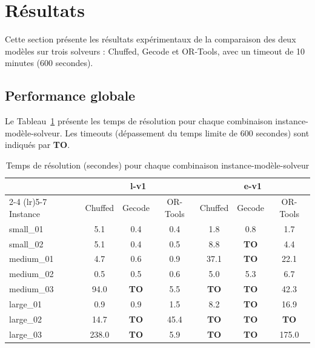 \section{Résultats}
\label{sec:resultats}

Cette section présente les résultats expérimentaux de la comparaison des deux modèles sur trois solveurs : Chuffed, Gecode et OR-Tools, avec un timeout de 10 minutes (600 secondes).

\subsection{Performance globale}

Le Tableau~\ref{tab:resultats_temps} présente les temps de résolution pour chaque combinaison instance-modèle-solveur. Les timeouts (dépassement du temps limite de 600 secondes) sont indiqués par \textbf{TO}.

\begin{table}[h]
	\centering
	\small
	\caption{Temps de résolution (secondes) pour chaque combinaison instance-modèle-solveur}
	\label{tab:resultats_temps}
	\begin{tabular}{lcccccc}
		\toprule
		           & \multicolumn{3}{c}{\textbf{l-v1}} & \multicolumn{3}{c}{\textbf{e-v1}}                                                      \\
		\cmidrule(lr){2-4} \cmidrule(lr){5-7}
		Instance   & Chuffed                                 & Gecode                                    & OR-Tools & Chuffed     & Gecode      & OR-Tools    \\
		\midrule
		small\_01  & 5.1                                     & 0.4                                       & 0.4      & 1.8         & 0.8         & 1.7         \\
		small\_02  & 5.1                                     & 0.4                                       & 0.5      & 8.8         & \textbf{TO} & 4.4         \\
		\midrule
		medium\_01 & 4.7                                     & 0.6                                       & 0.9      & 37.1        & \textbf{TO}  & 22.1        \\
		medium\_02 & 0.5                                     & 0.5                                       & 0.6      & 5.0         & 5.3          & 6.7         \\
		medium\_03 & 94.0                                    & \textbf{TO}                               & 5.5      & \textbf{TO} & \textbf{TO}  & 42.3        \\
		\midrule
		large\_01  & 0.9                                     & 0.9                                       & 1.5      & 8.2         & \textbf{TO}  & 16.9        \\
		large\_02  & 14.7                                    & \textbf{TO}                               & 45.4     & \textbf{TO} & \textbf{TO}  & \textbf{TO} \\
		large\_03  & 238.0                                   & \textbf{TO}                               & 5.9      & \textbf{TO} & \textbf{TO}  & 175.0       \\
		\bottomrule
	\end{tabular}
\end{table}

